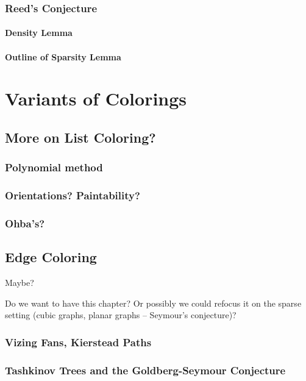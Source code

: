 \documentclass[12pt,twoside,openright,a4paper]{book}
\begin{document}
\section{Reed's Conjecture}
\subsection{Density Lemma}
\subsection{Outline of Sparsity Lemma}

\part{Variants of Colorings}

\chapter{More on List Coloring?}

\section{Polynomial method}

\section{Orientations? Paintability?}
\section{Ohba's?}

\chapter{Edge Coloring}\label{chap:edgecol}

Maybe?

Do we want to have this chapter?  Or possibly we could refocus it on the
sparse setting (cubic graphs, planar graphs -- Seymour's conjecture)?

\section{Vizing Fans, Kierstead Paths}
\section{Tashkinov Trees and the Goldberg-Seymour Conjecture}\label{sec:goseycon}
\end{document}
